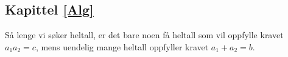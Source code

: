 






\subsection*{Kapittel \ref{Alg}}
\selos


Så lenge vi søker heltall, er det bare noen få heltall som vil oppfylle kravet $ a_1a_2=c $, mens uendelig mange heltall oppfyller kravet $ a_1+a_2=b $.



